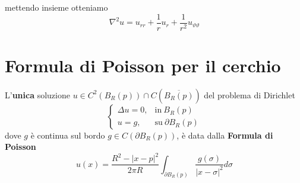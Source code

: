 \documentclass[10pt,a4paper,twoside,openright]{book}
\begin{document}
mettendo insieme otteniamo
\begin{equation*}
\nabla ^{2} u=u_{rr} +\frac{1}{r} u_{r} +\frac{1}{r^{2}} u_{\vartheta \vartheta }
\end{equation*}
\section{Formula di Poisson per il cerchio}
\begin{theorem}
L'\textbf{unica} soluzione $u\in C^{2}(B_{R}(p)) \cap C\left(\overline{B_{R}(p)}\right)$ del problema di Dirichlet
\begin{equation*}
\begin{cases}
\Delta u=0, & \text{in} \ B_{R}(p)\\
u=g, & \text{su} \ \partial B_{R}(p)
\end{cases}
\end{equation*}
dove $g$ è continua sul bordo $g\in C( \partial B_{R}(p))$, è data dalla \textbf{Formula di Poisson}
\begin{equation*}
u(x) =\frac{R^{2} -| x-p| ^{2}}{2\pi R}\int _{\partial B_{R}(p)}\frac{g(\sigma)}{| x-\sigma | ^{2}} d\sigma 
\end{equation*}
\end{theorem}
\end{document}
